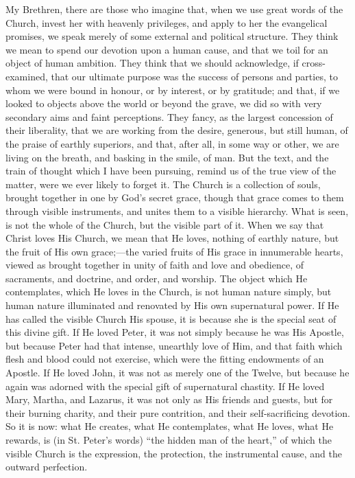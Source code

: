 My Brethren, there are those who imagine that, when we
use great words of the Church, invest her with heavenly
privileges, and apply to her the evangelical promises, we
speak merely of some external and political structure.
They think we mean to spend our devotion upon a human
cause, and that we toil for an object of human ambition.
They think that we should acknowledge, if cross-examined,
that our ultimate purpose was the success of persons and
parties, to whom we were bound in honour, or by interest,
or by gratitude; and that, if we looked to objects above
the world or beyond the grave, we did so with very
secondary aims and faint perceptions. They fancy, as the
largest concession of their liberality, that we are
working from the desire, generous, but still human, of
the praise of earthly superiors, and that, after all, in
some way or other, we are living on the breath, and
basking in the smile, of man. But the text, and the train
of thought which I have been pursuing, remind us of the
true view of the matter, were we ever likely to forget
it. The Church is a collection of souls, brought together
in one by God's secret grace, though that grace comes to
them through visible instruments, and unites them to a
visible hierarchy. What is seen, is not the whole of the
Church, but the visible part of it. When we say that
Christ loves His Church, we mean that He loves, nothing
of earthly nature, but the fruit of His own
grace;—the varied fruits of His grace in innumerable
hearts, viewed as brought together in unity of faith and
love and obedience, of sacraments, and doctrine, and
order, and worship. The object which He contemplates,
which He loves in the Church, is not human nature simply,
but human nature illuminated and renovated by His own
supernatural power. If He has called the visible Church
His spouse, it is because she is the special seat of this
divine gift. If He loved Peter, it was not simply because
he was His Apostle, but because Peter had that intense,
unearthly love of Him, and that faith which flesh and
blood could not exercise, which were the fitting
endowments of an Apostle. If He loved John, it was not as
merely one of the Twelve, but because he again was
adorned with the special gift of supernatural chastity.
If He loved Mary, Martha, and Lazarus, it was not only as
His friends and guests, but for their burning charity,
and their pure contrition, and their self-sacrificing
devotion. So it is now: what He creates, what He
contemplates, what He loves, what He rewards, is (in St.
Peter's words) ``the hidden man of the heart,''
of which the visible Church is the expression, the
protection, the instrumental cause, and the outward
perfection.

